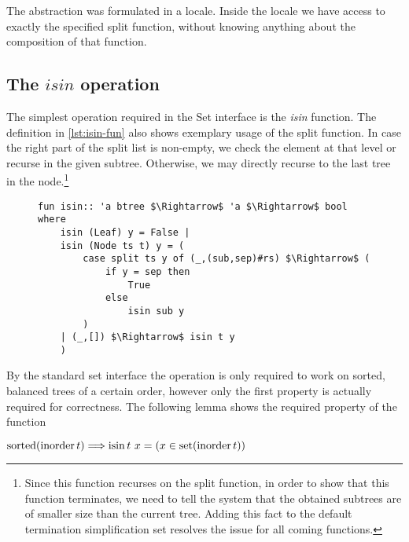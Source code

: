 The abstraction was formulated in a locale.
Inside the locale we have access to exactly the specified split function,
without knowing anything about the composition of that function.

\subsection{The $isin$ operation}

The simplest operation required in the Set interface is
the \textit{isin} function.
The definition in \autoref{lst:isin-fun} also shows exemplary usage of the split function.
In case the right part of the split list is non-empty,
we check the element at that level or recurse in the given subtree.
Otherwise, we may directly recurse to the last tree in the node.\footnote{
    Since this function recurses on the split function,
    in order to show that this function terminates, we need to tell
    the system that the obtained subtrees are of smaller size than the current tree.
    Adding this fact to the default termination simplification set resolves
    the issue for all coming functions.
}

\begin{figure}
\begin{lstlisting}[mathescape=true, language=Isabelle, caption=The \textit{isin} function, label=lst:isin-fun]
fun isin:: 'a btree $\Rightarrow$ 'a $\Rightarrow$ bool where
    isin (Leaf) y = False |
    isin (Node ts t) y = (
        case split ts y of (_,(sub,sep)#rs) $\Rightarrow$ (
            if y = sep then
                True
            else
                isin sub y
        )
    | (_,[]) $\Rightarrow$ isin t y
    )
\end{lstlisting}
\end{figure}

By the standard set interface the operation is only required to work on
sorted, balanced trees of a certain order, however only the first property
is actually required for correctness.
The following lemma shows the required property of the function

\begin{theorem}
    \label{thm:isin-set}
    $\operatorname{sorted} (\operatorname{inorder} t) \Longrightarrow \operatorname{isin} t\ x = (x \in \operatorname{set} (\operatorname{inorder} t))$
\end{theorem}

